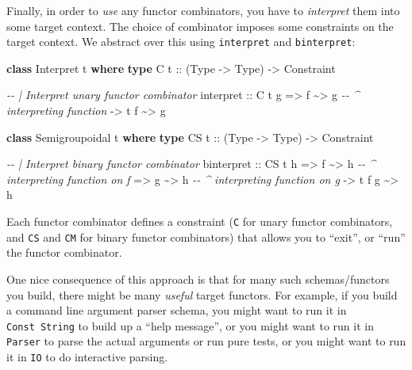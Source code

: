 \documentclass[]{article}
\newenvironment{Shaded}{}{}
\newcommand{\CommentTok}[1]{\textcolor[rgb]{0.38,0.63,0.69}{\textit{#1}}}
\newcommand{\DataTypeTok}[1]{\textcolor[rgb]{0.56,0.13,0.00}{#1}}
\newcommand{\KeywordTok}[1]{\textcolor[rgb]{0.00,0.44,0.13}{\textbf{#1}}}
\newcommand{\NormalTok}[1]{#1}
\newcommand{\OperatorTok}[1]{\textcolor[rgb]{0.40,0.40,0.40}{#1}}
\newcommand{\OtherTok}[1]{\textcolor[rgb]{0.00,0.44,0.13}{#1}}
\begin{document}
Finally, in order to \emph{use} any functor combinators, you have to
\emph{interpret} them into some target context. The choice of combinator imposes
some constraints on the target context. We abstract over this using
\texttt{interpret} and \texttt{binterpret}:

\begin{Shaded}
\begin{Highlighting}[]
\KeywordTok{class} \DataTypeTok{Interpret}\NormalTok{ t }\KeywordTok{where}
    \KeywordTok{type} \DataTypeTok{C}\OtherTok{ t ::}\NormalTok{ (}\DataTypeTok{Type} \OtherTok{{-}>} \DataTypeTok{Type}\NormalTok{) }\OtherTok{{-}>} \DataTypeTok{Constraint}

    \CommentTok{{-}{-} | Interpret unary functor combinator}
\NormalTok{    interpret}
\OtherTok{        ::} \DataTypeTok{C}\NormalTok{ t g}
        \OtherTok{=>}\NormalTok{ f }\OperatorTok{\textasciitilde{}>}\NormalTok{ g             }\CommentTok{{-}{-} \^{} interpreting function}
        \OtherTok{{-}>}\NormalTok{ t f }\OperatorTok{\textasciitilde{}>}\NormalTok{ g}

\KeywordTok{class} \DataTypeTok{Semigroupoidal}\NormalTok{ t }\KeywordTok{where}
    \KeywordTok{type} \DataTypeTok{CS}\OtherTok{ t ::}\NormalTok{ (}\DataTypeTok{Type} \OtherTok{{-}>} \DataTypeTok{Type}\NormalTok{) }\OtherTok{{-}>} \DataTypeTok{Constraint}

    \CommentTok{{-}{-} | Interpret binary functor combinator}
\NormalTok{    binterpret}
\OtherTok{        ::} \DataTypeTok{CS}\NormalTok{ t h}
        \OtherTok{=>}\NormalTok{ f }\OperatorTok{\textasciitilde{}>}\NormalTok{ h             }\CommentTok{{-}{-} \^{} interpreting function on f}
        \OtherTok{=>}\NormalTok{ g }\OperatorTok{\textasciitilde{}>}\NormalTok{ h             }\CommentTok{{-}{-} \^{} interpreting function on g}
        \OtherTok{{-}>}\NormalTok{ t f g }\OperatorTok{\textasciitilde{}>}\NormalTok{ h}
\end{Highlighting}
\end{Shaded}

Each functor combinator defines a constraint (\texttt{C} for unary functor
combinators, and \texttt{CS} and \texttt{CM} for binary functor combinators)
that allows you to ``exit'', or ``run'' the functor combinator.

One nice consequence of this approach is that for many such schemas/functors you
build, there might be many \emph{useful} target functors. For example, if you
build a command line argument parser schema, you might want to run it in
\texttt{Const\ String} to build up a ``help message'', or you might want to run
it in \texttt{Parser} to parse the actual arguments or run pure tests, or you
might want to run it in \texttt{IO} to do interactive parsing.
\end{document}
